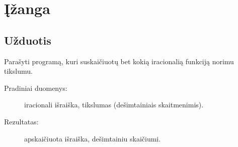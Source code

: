 \chapter{Įžanga}

\section{Užduotis}

Parašyti programą, kuri suskaičiuotų bet kokią iracionalią funkciją norimu
tikslumu.

\begin{description}
  \item[Pradiniai duomenys:] iracionali išraiška, tikslumas (dešimtainiais 
    skaitmenimis).
  \item[Rezultatas:] apskaičiuota išraiška, dešimtainiu skaičiumi.
\end{description}




